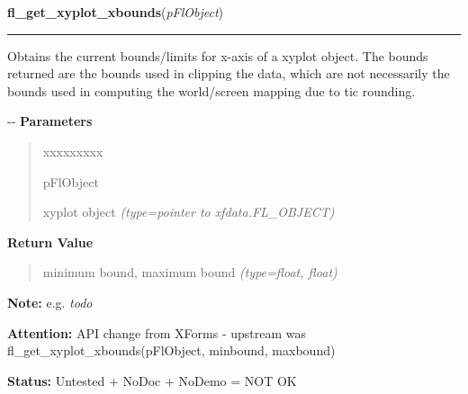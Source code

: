 \hspace{.8\funcindent}\begin{boxedminipage}{\funcwidth}

    \raggedright \textbf{fl\_get\_xyplot\_xbounds}(\textit{pFlObject})

    \vspace{-1.5ex}

    \rule{\textwidth}{0.5\fboxrule}
\setlength{\parskip}{2ex}

Obtains the current bounds/limits for x-axis of a xyplot object. The
bounds returned are the bounds used in clipping the data, which are not
necessarily the bounds used in computing the world/screen mapping due to
tic rounding.

-{}-
\setlength{\parskip}{1ex}
      \textbf{Parameters}
      \vspace{-1ex}

      \begin{quote}
        \begin{Ventry}{xxxxxxxxx}

          \item[pFlObject]


xyplot object
            {\it (type=pointer to xfdata.FL\_OBJECT)}

        \end{Ventry}

      \end{quote}

      \textbf{Return Value}
    \vspace{-1ex}

      \begin{quote}

minimum bound, maximum bound
      {\it (type=float, float)}

      \end{quote}

\textbf{Note:} 
e.g. \emph{todo}


\textbf{Attention:} 
API change from XForms - upstream was
fl\_get\_xyplot\_xbounds(pFlObject, minbound, maxbound)


\textbf{Status:} 
Untested + NoDoc + NoDemo = NOT OK


    \end{boxedminipage}

    \label{xformslib:flxyplot:fl_get_xyplot_ybounds}

